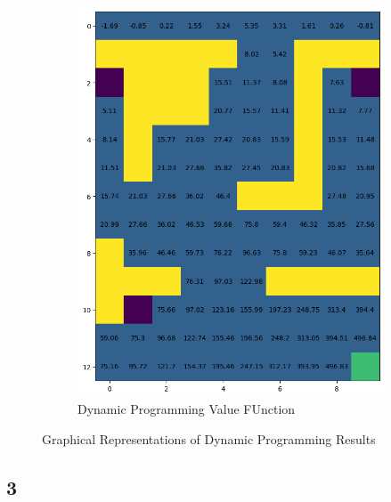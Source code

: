 \begin{figure}[H]
\begin{subfigure}[b]{0.4\textwidth}
        \includegraphics[width=\textwidth]{assets/dp/dp_value_function.png}        
        \caption{Dynamic Programming Value FUnction}
    \end{subfigure}
    \caption*{Graphical Representations of Dynamic Programming Results}
\end{figure} 

\subsection*{3}

